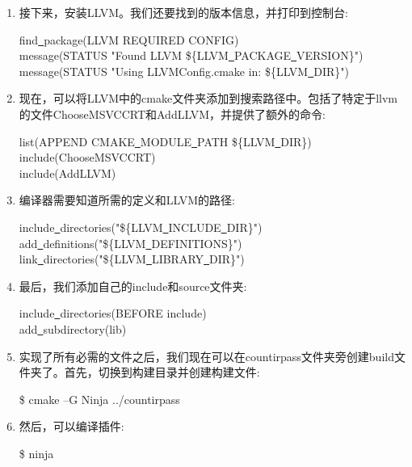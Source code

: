 \begin{enumerate}
	\item 接下来，安装LLVM。我们还要找到的版本信息，并打印到控制台:
	\begin{tcolorbox}[colback=white,colframe=black]
		find\underline{~}package(LLVM REQUIRED CONFIG) \\
		message(STATUS "Found LLVM \$\{LLVM\underline{~}PACKAGE\underline{~}VERSION\}") \\
		message(STATUS "Using LLVMConfig.cmake in: \$\{LLVM\underline{~}DIR\}")
	\end{tcolorbox}
	
	\item 现在，可以将LLVM中的cmake文件夹添加到搜索路径中。包括了特定于llvm的文件ChooseMSVCCRT和AddLLVM，并提供了额外的命令:
	\begin{tcolorbox}[colback=white,colframe=black]
		list(APPEND CMAKE\underline{~}MODULE\underline{~}PATH \$\{LLVM\underline{~}DIR\}) \\
		include(ChooseMSVCCRT) \\
		include(AddLLVM)
	\end{tcolorbox}
	
	\item 编译器需要知道所需的定义和LLVM的路径:
	\begin{tcolorbox}[colback=white,colframe=black]
		include\underline{~}directories("\$\{LLVM\underline{~}INCLUDE\underline{~}DIR\}") \\
		add\underline{~}definitions("\$\{LLVM\underline{~}DEFINITIONS\}") \\
		link\underline{~}directories("\$\{LLVM\underline{~}LIBRARY\underline{~}DIR\}")
	\end{tcolorbox}
	
	\item 最后，我们添加自己的include和source文件夹:
	\begin{tcolorbox}[colback=white,colframe=black]
		include\underline{~}directories(BEFORE include) \\
		add\underline{~}subdirectory(lib)
	\end{tcolorbox}
	
	\item 实现了所有必需的文件之后，我们现在可以在countirpass文件夹旁创建build文件夹了。首先，切换到构建目录并创建构建文件:
	\begin{tcolorbox}[colback=white,colframe=black]
		\$ cmake –G Ninja ../countirpass
	\end{tcolorbox}
	
	\item 然后，可以编译插件:
	\begin{tcolorbox}[colback=white,colframe=black]
		\$ ninja
	\end{tcolorbox}
	

\end{enumerate}
